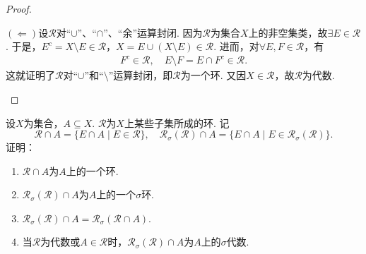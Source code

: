 \documentclass[../../main.tex]{subfiles}%
\begin{document}
\begin{proof}
\begin{enumerate}[(1)]
$(\Leftarrow)$设$\mathscr{R}$对“$\cup$”、“$\cap$”、“余”运算封闭. 因为$\mathscr{R}$为集合$X$上的非空集类，故$\exists E\in\mathscr{R}$. 于是，$E^c=X\setminus E\in\mathscr{R}$，$X=E\cup(X\setminus E)\in\mathscr{R}$. 进而，对$\forall E,F\in\mathscr{R}$，有
\begin{align*}
F^c\in\mathscr{R},\quad E\setminus F=E\cap F^c\in\mathscr{R}.
\end{align*}
这就证明了$\mathscr{R}$对“$\cup$”和“$\setminus$”运算封闭，即$\mathscr{R}$为一个环. 又因$X\in\mathscr{R}$，故$\mathscr{R}$为代数.
\end{enumerate}
\end{proof}

\begin{proposition}\label{proposition:集合论命题j8oj82r339008jr}
设$X$为集合，$A\subseteq X$. $\mathscr{R}$为$X$上某些子集所成的环. 记
\[
\mathscr{R}\cap A=\{E\cap A\mid E\in\mathscr{R}\}, \quad \mathscr{R}_\sigma(\mathscr{R})\cap A=\{E\cap A\mid E\in\mathscr{R}_\sigma(\mathscr{R})\}.
\]
证明：
\begin{enumerate}[(1)]
\item\label{proposition:集合论命题j8oj82r339008jr-1} $\mathscr{R}\cap A$为$A$上的一个环.
\item\label{proposition:集合论命题j8oj82r339008jr-2} $\mathscr{R}_\sigma(\mathscr{R})\cap A$为$A$上的一个$\sigma$环.
\item\label{proposition:集合论命题j8oj82r339008jr-3} $\mathscr{R}_\sigma(\mathscr{R})\cap A=\mathscr{R}_\sigma(\mathscr{R}\cap A)$.
\item\label{proposition:集合论命题j8oj82r339008jr-4} 当$\mathscr{R}$为代数或$A\in\mathscr{R}$时，$\mathscr{R}_\sigma(\mathscr{R})\cap A$为$A$上的$\sigma$代数.
\end{enumerate}
\end{proposition}
\end{document}
